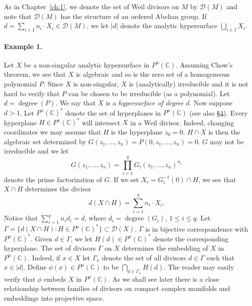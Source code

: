 As in Chapter~\ref{ch:1}, we denote the set of Weil divisors on $M$ by $\mathcal D(M)$ and note that $\mathcal D(M)$ has the structure of an ordered Abelian group. If $d=\sum_{i\in I}n_i\cdot X_i\in\mathcal D(M)$, we let $|d|$ denote the analytic hypersurface $\bigcup_{i\in I}X_i$.

\paragraph*{Example 1.} Let $X$ be a non-singular analytic hypersurface in $P^n(\mathbb C)$. Assuming Chow's theorem, we see that $X$ is algebraic and so is the zero set of a homogeneous polynomial $P$. Since $X$ is non-singular, $X$ is (analytically) irreducible and it is not hard to verify that $P$ can be chosen to be irreducible (as a polynomial). Let $d=\operatorname{degree}(P)$. We say that $X$ is a \emph{hypersurface of degree $d$}. Now suppose $d>1$. Let $P^n(\mathbb C)^*$ denote the set of hyperplanes in $P^n(\mathbb C)$ (see also \hyperref[sec:4:4]{\S4}). Every hyperplane $H\in P^n(\mathbb C)^*$ will intersect $X$ in a Weil divisor. Indeed, changing coordinates we may assume that $H$ is the hyperplane $z_0=0$. $H\cap X$ is then the algebraic set determined by $G(z_1,\ldots,z_n)=P(0,z_1,\ldots,z_n)=0$. $G$ may not be irreducible and we let
\[
G(z_1,\ldots,z_n)=\prod_{i=1}^qG_i(z_1,\ldots,z_n)^{n_i}
\]
denote the prime factorization of $G$. If we set $X_i=G_i^{-1}(0)\cap H$, we see that $X\cap H$ determines the divisor
\[
d(X\cap H)=\sum_{i=1}^qn_i\cdot X_i.
\]
Notice that $\sum_{i=1}^qn_id_i=d$, where $d_i=\operatorname{degree}(G_i)$, $1\leq i\leq q$. Let $\Gamma=\{d(X\cap H):H\in P^n(\mathbb C)^*\}\subset\mathcal D(X)$. $\Gamma$ is in bijective correspondence with $P^n(\mathbb C)^*$. Given $d\in\Gamma$, we let $H(d)\in P^n(\mathbb C)^*$ denote the corresponding hyperplane. The set of divisors $\Gamma$ on $X$ determines the embedding of $X$ in $P^n(\mathbb C)$. Indeed, if $x\in X$ let $\Gamma_x$ denote the set of all divisors $d\in\Gamma$ such
that $x\in|d|$. Define $\phi(x)\in P^n(\mathbb C)$ to be $\bigcap_{d\in\Gamma_x}H(d)$. The reader may easily verify that $\phi$ embeds $X$ in $P^n(\mathbb C)$. As we shall see later there is a close relationship between families of divisors on compact complex manifolds and embeddings into projective space.

